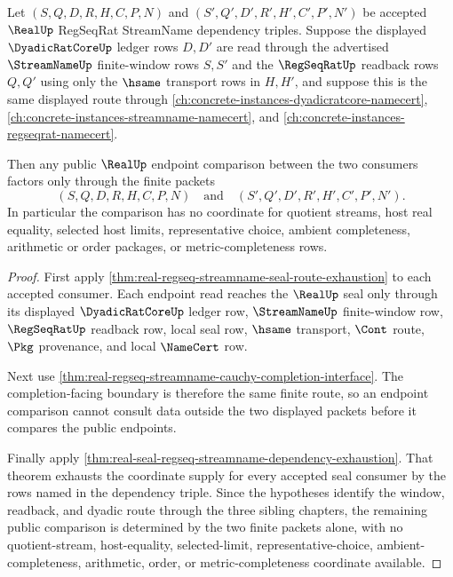 \begin{theorem}
\label{thm:real-regseq-streamname-endpoint-determinacy}
Let $(S,Q,D,R,H,C,P,N)$ and $(S',Q',D',R',H',C',P',N')$ be accepted
$\RealUp$ RegSeqRat StreamName dependency triples. Suppose the displayed
$\DyadicRatCoreUp$ ledger rows $D,D'$ are read through the advertised
$\StreamNameUp$ finite-window rows $S,S'$ and the $\RegSeqRatUp$ readback rows
$Q,Q'$ using only the $\hsame$ transport rows in $H,H'$, and suppose this is the
same displayed route through
\autoref{ch:concrete-instances-dyadicratcore-namecert},
\autoref{ch:concrete-instances-streamname-namecert}, and
\autoref{ch:concrete-instances-regseqrat-namecert}.

Then any public $\RealUp$ endpoint comparison between the two consumers
factors only through the finite packets
$$
(S,Q,D,R,H,C,P,N)
\quad\text{and}\quad
(S',Q',D',R',H',C',P',N').
$$
In particular the comparison has no coordinate for quotient streams, host
real equality, selected host limits, representative choice, ambient
completeness, arithmetic or order packages, or metric-completeness rows.
\end{theorem}
\begin{proof}
First apply
\autoref{thm:real-regseq-streamname-seal-route-exhaustion} to each accepted
consumer. Each endpoint read reaches the $\RealUp$ seal only through its
displayed $\DyadicRatCoreUp$ ledger row, $\StreamNameUp$ finite-window row,
$\RegSeqRatUp$ readback row, local seal row, $\hsame$ transport, $\Cont$ route,
$\Pkg$ provenance, and local $\NameCert$ row.

Next use
\autoref{thm:real-regseq-streamname-cauchy-completion-interface}. The
completion-facing boundary is therefore the same finite route, so an endpoint
comparison cannot consult data outside the two displayed packets before it
compares the public endpoints.

Finally apply
\autoref{thm:real-seal-regseq-streamname-dependency-exhaustion}. That theorem
exhausts the coordinate supply for every accepted seal consumer by the rows
named in the dependency triple. Since the hypotheses identify the window,
readback, and dyadic route through the three sibling chapters, the remaining
public comparison is determined by the two finite packets alone, with no
quotient-stream, host-equality, selected-limit, representative-choice,
ambient-completeness, arithmetic, order, or metric-completeness coordinate
available.
\end{proof}

